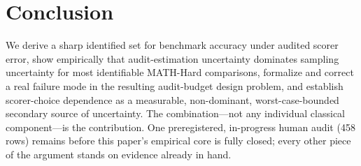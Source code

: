 \section{Conclusion}
\label{sec:conclusion}

We derive a sharp identified set for benchmark accuracy under audited
scorer error, show empirically that audit-estimation uncertainty dominates
sampling uncertainty for most identifiable MATH-Hard comparisons, formalize
and correct a real failure mode in the resulting audit-budget design
problem, and establish scorer-choice dependence as a measurable,
non-dominant, worst-case-bounded secondary source of uncertainty. The
combination---not any individual classical component---is the contribution.
One preregistered, in-progress human audit (458 rows) remains before this
paper's empirical core is fully closed; every other piece of the argument
stands on evidence already in hand.
